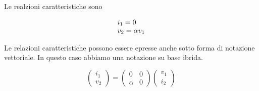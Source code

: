 \documentclass[a4paper]{report}
\begin{document}
Le realzioni caratteristiche sono

\[
\begin{array}{l l}
  i_1=0 \\
  v_2=\alpha v_1\\
\end{array}
\]

Le relazioni caratteristiche possono essere epresse anche sotto forma
di notazione vettoriale. In questo caso abbiamo una notazione su base
ibrida.

\[
\left(
\begin{array}{c}
  i_1\\
  v_2
\end{array}
\right)=
\begin{pmatrix}
  0 & 0\\
  \alpha & 0
\end{pmatrix}
\left(
\begin{array}{c}
  v_1\\
  i_2
\end{array}
\right)
\]
\end{document}
